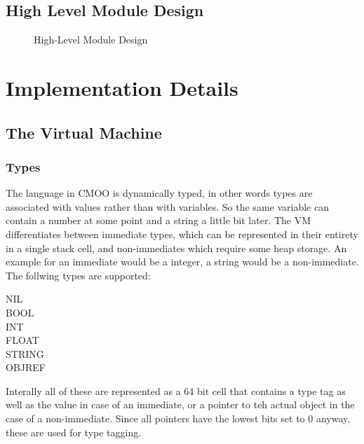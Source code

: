 \documentclass[12pt,a4paper]{article}
\begin{document}

\subsection{High Level Module Design}\label{sec:hl_design}

\begin{figure}[htb]
\centering

\caption{High-Level Module Design}
\end{figure}

\section{Implementation Details}\label{sec:implementation_details}

\subsection{The Virtual Machine}\label{sec:virtual_machine}

\subsubsection{Types}\label{sec:types}

The language in CMOO is dynamically typed, in other words types are associated with values rather than with variables. So the same variable can contain a number at some point and a string a little bit later. The VM differentiates between immediate types, which can be represented in their entirety in a single stack cell, and non-immediates which require some heap storage. An example for an immediate would be a integer, a string would be a non-immediate. The follwing types are supported:

\begin{description}
\item[NIL]
\item[BOOL]
\item[INT]
\item[FLOAT]
\item[STRING]
\item[OBJREF]
\end{description}

Interally all of these are represented as a 64 bit cell that contains a type tag as well as the value in case of an immediate, or a pointer to teh actual object in the case of a non-immediate. Since all pointers have the lowest bits set to 0 anyway, these are used for type tagging.
\end{document}
